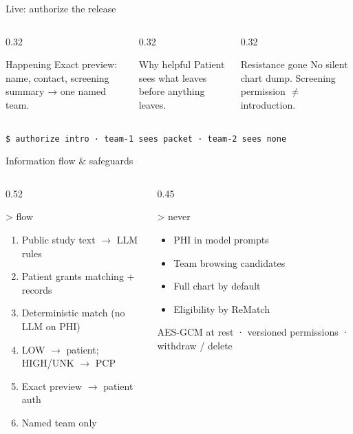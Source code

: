 \documentclass[aspectratio=169,10pt]{beamer}
\begin{document}
\begin{frame}{Live: authorize the release}
\begin{columns}[T]
\begin{column}{0.32\textwidth}
\begin{tbox}{Happening}
\small
Exact preview: name, contact, screening summary → one named team.
\end{tbox}
\end{column}
\begin{column}{0.32\textwidth}
\begin{tbox}{Why helpful}
\small
Patient sees \alert{what} leaves before anything leaves.
\end{tbox}
\end{column}
\begin{column}{0.32\textwidth}
\begin{tbox}{Resistance gone}
\small
No silent chart dump. Screening permission $\neq$ introduction.
\end{tbox}
\end{column}
\end{columns}
\vskip12pt
\centering\small\texttt{\$ authorize intro · team-1 sees packet · team-2 sees none}\,\terminalcursor
\end{frame}

\begin{frame}{Information flow \& safeguards}
\begin{columns}[T]
\begin{column}{0.52\textwidth}
\begin{tbox}{> flow}
\footnotesize
\begin{enumerate}
\item Public study text $\rightarrow$ LLM rules
\item Patient grants matching + records
\item Deterministic match (no LLM on PHI)
\item LOW $\rightarrow$ patient; HIGH/UNK $\rightarrow$ PCP
\item Exact preview $\rightarrow$ patient auth
\item Named team only
\end{enumerate}
\end{tbox}
\end{column}
\begin{column}{0.45\textwidth}
\begin{tbox}{> never}
\footnotesize
\begin{itemize}
\item PHI in model prompts
\item Team browsing candidates
\item Full chart by default
\item Eligibility by ReMatch
\end{itemize}
\end{tbox}
\vskip8pt
\begin{pbox}
\footnotesize
AES-GCM at rest · versioned permissions · withdraw / delete
\end{pbox}
\end{column}
\end{columns}
\end{frame}

\end{document}
